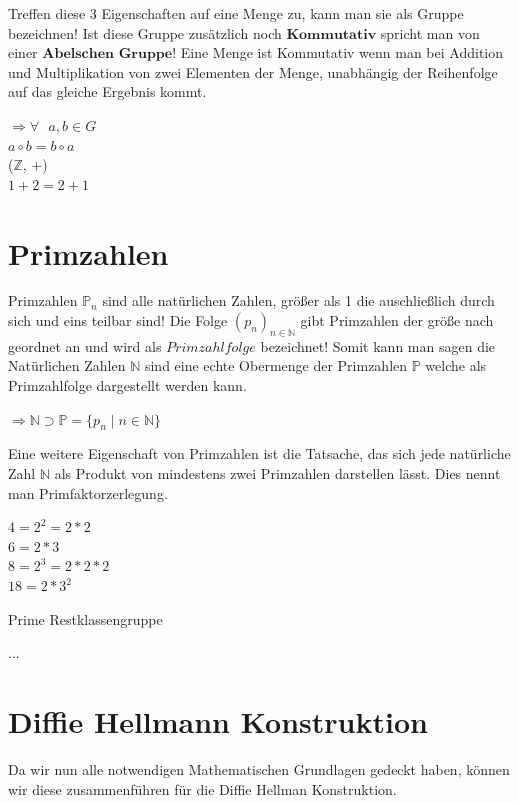 \documentclass[a4paper,12pt]{scrartcl}
\begin{document}
Treffen diese 3 Eigenschaften auf eine Menge zu, kann man sie als Gruppe bezeichnen!
Ist diese Gruppe zusätzlich noch $\textbf{Kommutativ}$ spricht man von einer $\textbf{Abelschen Gruppe}$!
Eine Menge ist Kommutativ wenn man bei Addition und Multiplikation von zwei Elementen der Menge, unabhängig der Reihenfolge auf das gleiche Ergebnis kommt.

\begin{center}
 $\Rightarrow \forall \text{ } a,b \in G$\\
 $a \circ b = b \circ a$\\
 ($\mathbb{Z}$, +)\\
 $1 + 2 = 2 + 1$
\end{center}






\section{Primzahlen}

Primzahlen $\mathbb{P}_{n}$ sind alle natürlichen Zahlen, größer als 1 die auschließlich durch sich und eins teilbar sind!\newline
Die Folge ${\displaystyle \left(p_{n}\right)_{n\in \mathbb {N} }}$ gibt Primzahlen der größe nach geordnet an und wird als $Primzahlfolge$ bezeichnet!
Somit kann man sagen die Natürlichen Zahlen $\mathbb{N}$ sind eine echte Obermenge der Primzahlen $\mathbb{P}$ welche als Primzahlfolge dargestellt werden kann.
\begin{center}
$\Rightarrow \displaystyle \mathbb {N} \supset \mathbb {P} =\{p_{n}\mid n\in \mathbb {N} \}$
\end{center}

Eine weitere Eigenschaft von Primzahlen ist die Tatsache, das sich jede natürliche Zahl $\mathbb{N}$ als Produkt von mindestens zwei Primzahlen darstellen lässt. Dies nennt man Primfaktorzerlegung.
\begin{center}
 $4 = 2^2 = 2 * 2$\\
 $6 = 2 * 3$\\
 $8 = 2^3 = 2 * 2 * 2$\\
 $18 = 2 * 3^2$
\end{center}

Prime Restklassengruppe




...
\newpage
\section{Diffie Hellmann Konstruktion}
Da wir nun alle notwendigen Mathematischen Grundlagen gedeckt haben, können wir diese zusammenführen für die Diffie Hellman Konstruktion.\\
\end{document}
